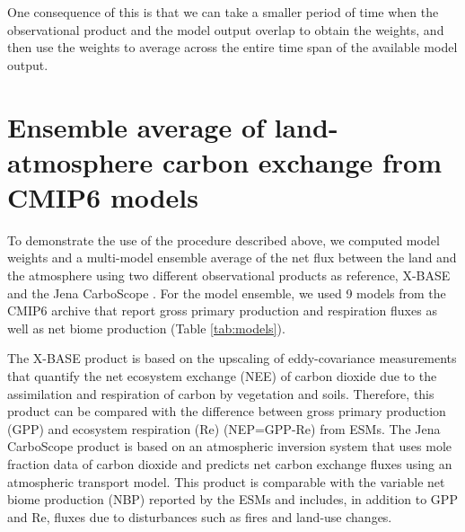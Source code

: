 \documentclass[gmd, manuscript]{copernicus}
\begin{document}
One consequence of this is that we can take a smaller period of time when the observational product and the model output overlap to obtain the weights, and then use the weights to average across the entire time span of the available model output. 

\section{Ensemble average of land-atmosphere carbon exchange from CMIP6 models}
To demonstrate the use of the procedure described above, we computed model weights and a multi-model ensemble average of the net flux between the land and the atmosphere using two different observational products as reference, X-BASE \citep{Nelson2024} and the Jena CarboScope \citep{Rodenbeck2005}. For the model ensemble, we used 9 models from the CMIP6 archive that report gross primary production and respiration fluxes as well as net biome production (Table \ref{tab:models}).

The X-BASE product is based on the upscaling of eddy-covariance measurements that quantify the net ecosystem exchange (NEE) of carbon dioxide due to the assimilation and respiration of carbon by vegetation and soils. Therefore, this product can be compared with the difference between gross primary production (GPP) and ecosystem respiration (Re) (NEP=GPP-Re) from ESMs. The Jena CarboScope product is based on an atmospheric inversion system that uses mole fraction data of carbon dioxide and predicts net carbon exchange fluxes using an atmospheric transport model. This product is comparable with the variable net biome production (NBP) reported by the ESMs and includes, in addition to GPP and Re, fluxes due to disturbances such as fires and land-use changes. 
\end{document}

